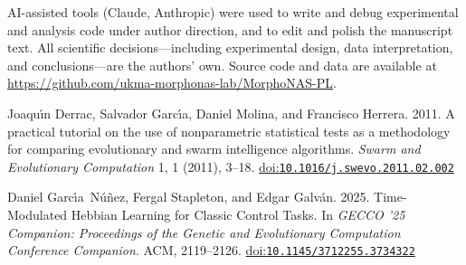 \documentclass[sigconf,nonacm]{acmart}
\begin{document}
\begin{acks}
AI-assisted tools (Claude, Anthropic) were used to write and debug experimental and analysis code under author direction, and to edit and polish the manuscript text. All scientific decisions---including experimental design, data interpretation, and conclusions---are the authors' own. Source code and data are available at \url{https://github.com/ukma-morphonas-lab/MorphoNAS-PL}.
\end{acks}

\begin{thebibliography}{18}

\ifx \showCODEN    \undefined {}     \fi
\ifx \showISBNx    \undefined \def \showISBNx     #1{\unskip}     \fi
\ifx \showISBNxiii \undefined \def \showISBNxiii  #1{\unskip}     \fi
\ifx \showISSN     \undefined \def \showISSN      #1{\unskip}     \fi
\ifx \showLCCN     \undefined \def \showLCCN      #1{\unskip}     \fi
\ifx \shownote     \undefined \def \shownote      #1{#1}          \fi
\ifx \showarticletitle \undefined \def \showarticletitle #1{#1}   \fi
\ifx \showURL      \undefined \def \showURL       {\relax}        \fi
\providecommand\bibfield[2]{#2}
\providecommand\bibinfo[2]{#2}
\providecommand\natexlab[1]{#1}
\providecommand\showeprint[2][]{arXiv:#2}

\bibfield{author}{\bibinfo{person}{Joaqu{\'\i}n Derrac},
  \bibinfo{person}{Salvador Garc{\'\i}a}, \bibinfo{person}{Daniel Molina},
  {and} \bibinfo{person}{Francisco Herrera}.} \bibinfo{year}{2011}\natexlab{}.
\newblock \showarticletitle{A practical tutorial on the use of nonparametric
  statistical tests as a methodology for comparing evolutionary and swarm
  intelligence algorithms}.
\newblock \bibinfo{journal}{\emph{Swarm and Evolutionary Computation}}
  \bibinfo{volume}{1}, \bibinfo{number}{1} (\bibinfo{year}{2011}),
  \bibinfo{pages}{3--18}.
\newblock
\href{https://doi.org/10.1016/j.swevo.2011.02.002}{doi:\nolinkurl{10.1016/j.swevo.2011.02.002}}


\bibfield{author}{\bibinfo{person}{Daniel Garc{\'\i}a~N{\'u}{\~n}ez},
  \bibinfo{person}{Fergal Stapleton}, {and} \bibinfo{person}{Edgar
  Galv{\'a}n}.} \bibinfo{year}{2025}\natexlab{}.
\newblock \showarticletitle{Time-Modulated {H}ebbian Learning for Classic
  Control Tasks}. In \bibinfo{booktitle}{\emph{GECCO '25 Companion: Proceedings
  of the Genetic and Evolutionary Computation Conference Companion}}.
  \bibinfo{publisher}{ACM}, \bibinfo{pages}{2119--2126}.
\newblock
\href{https://doi.org/10.1145/3712255.3734322}{doi:\nolinkurl{10.1145/3712255.3734322}}



\end{thebibliography}
\end{document}
